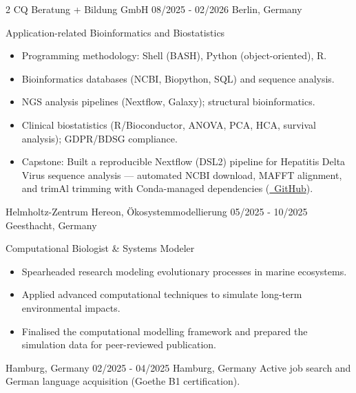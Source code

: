 \documentclass{thejus_cv}
\begin{document}
\begin{paracol}{2}
             {CQ Beratung + Bildung GmbH}
             {08/2025 - 02/2026}
             {Berlin, Germany}
             {Application-related Bioinformatics and Biostatistics
             \begin{itemize}\setlength{\itemsep}{0.05em}
                 \item Programming methodology: Shell (BASH), Python (object-oriented), R.
                 \item Bioinformatics databases (NCBI, Biopython, SQL) and sequence analysis.
                 \item NGS analysis pipelines (Nextflow, Galaxy); structural bioinformatics.
                 \item Clinical biostatistics (R/Bioconductor, ANOVA, PCA, HCA, survival analysis); GDPR/BDSG compliance.
                 \item Capstone: Built a reproducible Nextflow (DSL2) pipeline for Hepatitis Delta Virus sequence analysis --- automated NCBI download, MAFFT alignment, and trimAl trimming with Conda-managed dependencies (\href{https://github.com/thejusmahajan/hepatitis-delta-pipeline}{\faGithub\ GitHub}).
             \end{itemize}}

             {Helmholtz-Zentrum Hereon, \"Okosystemmodellierung}
             {05/2025 - 10/2025}
             {Geesthacht, Germany}
             {Computational Biologist \& Systems Modeler
             \begin{itemize}
                 \item Spearheaded research modeling evolutionary processes in marine ecosystems.
                 \item Applied advanced computational techniques to simulate long-term environmental impacts.
                 \item Finalised the computational modelling framework and prepared the simulation data for peer-reviewed publication.
             \end{itemize}}

             {Hamburg, Germany}
             {02/2025 - 04/2025}
             {Hamburg, Germany}
             {Active job search and German language acquisition (Goethe B1 certification).}


\end{paracol}
\end{document}
